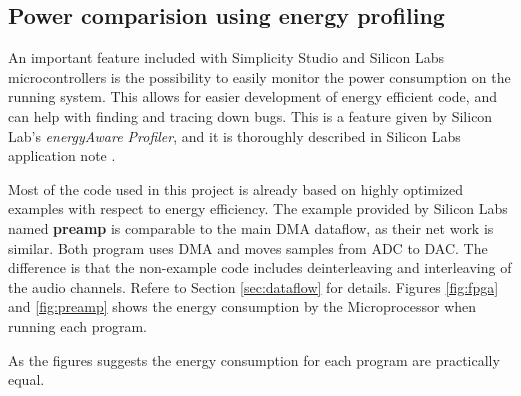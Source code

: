 \subsection{Power comparision using energy profiling}

An important feature included with Simplicity Studio and Silicon Labs microcontrollers
is the possibility to easily monitor the power consumption on the running system.
This allows for easier development of energy efficient code, and can help
with finding and tracing down bugs.
This is a feature given by Silicon Lab's \textit{energyAware Profiler}, and it is thoroughly
described in Silicon Labs application note \cite{energydbg}.

Most of the code used in this project is already based on highly optimized
examples with respect to energy efficiency.
The example provided by Silicon Labs named {\bf preamp} is comparable to the main
DMA dataflow, as their net work is similar. Both program uses DMA and moves samples
from ADC to DAC. The difference is that the non-example code includes deinterleaving
and interleaving of the audio channels. Refere to Section \ref{sec:dataflow}
for details. Figures \ref{fig:fpga} and \ref{fig:preamp}
shows the energy consumption by the Microprocessor when running each program.





As the figures suggests the energy consumption for each program are practically equal.
